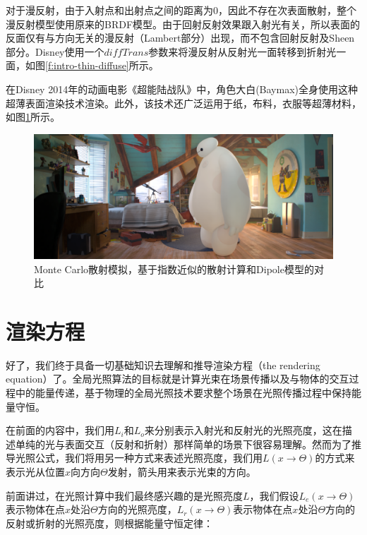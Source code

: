 对于漫反射，由于入射点和出射点之间的距离为0，因此不存在次表面散射，整个漫反射模型使用原来的BRDF模型。由于回射反射效果跟入射光有关，所以表面的反面仅有与方向无关的漫反射（Lambert部分）出现，而不包含回射反射及Sheen部分。Disney使用一个$diffTrans$参数来将漫反射从反射光一面转移到折射光一面，如图\ref{f:intro-thin-diffuse}所示。

在Disney 2014年的动画电影《超能陆战队》中，角色大白(Baymax)全身使用这种超薄表面渲染技术渲染。此外，该技术还广泛运用于纸，布料，衣服等超薄材料，如图\ref{f:intro-thin-baymax}所示。

\begin{figure}
	\includegraphics[width=1.\textwidth]{figures/intro/original-fullcomp-filtered}
	\caption{Monte Carlo散射模拟，基于指数近似的散射计算和Dipole模型的对比}
	\label{f:intro-thin-baymax}
\end{figure}





\section{渲染方程}\label{sec:intro-the-rendering-equation}
好了，我们终于具备一切基础知识去理解和推导渲染方程（the rendering equation）了。全局光照算法的目标就是计算光束在场景传播以及与物体的交互过程中的能量传递，基于物理的全局光照技术要求整个场景在光照传播过程中保持能量守恒。

在前面的内容中，我们用$L_i$和$L_o$来分别表示入射光和反射光的光照亮度，这在描述单纯的光与表面交互（反射和折射）那样简单的场景下很容易理解。然而为了推导光照公式，我们将用另一种方式来表述光照亮度，我们用$L(x\to\Theta)$的方式来表示光从位置$x$向方向$\Theta$发射，箭头用来表示光束的方向。

前面讲过，在光照计算中我们最终感兴趣的是光照亮度$L$，我们假设$L_e(x\to\Theta)$表示物体在点$x$处沿$\Theta$方向的光照亮度，$L_r(x\to\Theta)$表示物体在点$x$处沿$\Theta$方向的反射或折射的光照亮度，则根据能量守恒定律：

